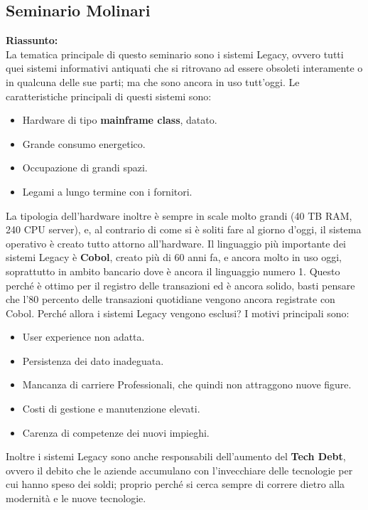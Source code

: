 \documentclass{article}
\begin{document}
\subsection{Seminario Molinari}
\textbf{Riassunto:}
\\
La tematica principale di questo seminario sono i sistemi Legacy, ovvero tutti quei  sistemi informativi antiquati che si ritrovano ad essere obsoleti interamente o in qualcuna delle sue parti; ma che sono ancora in uso tutt'oggi.
Le caratteristiche principali di questi sistemi sono:
\begin{itemize}
    \item Hardware di tipo \textbf{mainframe class}, datato.
    \item Grande consumo energetico.
    \item Occupazione di grandi spazi.
    \item Legami a lungo termine con i fornitori.
\end{itemize}
La tipologia dell'hardware inoltre è sempre in scale molto grandi (40 TB RAM, 240 CPU server), e, al contrario di come si è soliti fare al giorno d'oggi, il sistema operativo è creato tutto attorno all'hardware.
Il linguaggio più importante dei sistemi Legacy è \textbf{Cobol}, creato più di 60 anni fa, e ancora molto in uso oggi, soprattutto in ambito bancario dove è ancora il linguaggio numero 1. Questo perché è ottimo per il registro delle transazioni ed è ancora solido, basti pensare che l'80 percento delle transazioni quotidiane vengono ancora registrate con Cobol.
Perché allora i sistemi Legacy vengono esclusi? I motivi principali sono:
\begin{itemize}
    \item User experience non adatta.
    \item Persistenza dei dato inadeguata.
    \item Mancanza di carriere Professionali, che quindi non attraggono nuove figure.
    \item Costi di gestione e manutenzione elevati.
    \item Carenza di competenze dei nuovi impieghi.
\end{itemize}
Inoltre i sistemi Legacy sono anche responsabili dell'aumento del \textbf{Tech Debt}, ovvero il debito che le aziende accumulano con l'invecchiare delle tecnologie per cui hanno speso dei soldi; proprio perché si cerca sempre di correre dietro alla modernità e le nuove tecnologie.
\end{document}
